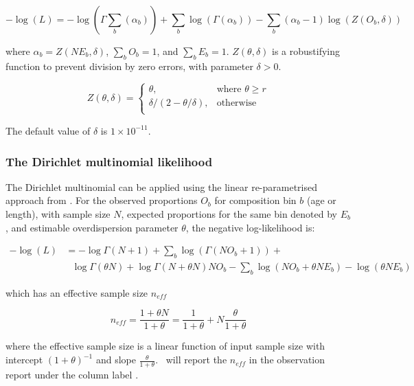 \begin{equation}
-\log \left(L \right) = -\log(\Gamma \sum\limits_b (\alpha_b)) + \sum\limits_b \log(\Gamma (\alpha_b)) - \sum\limits_b (\alpha_b-1) \log(Z(O_b,\delta))
\end{equation}

where $\alpha_b = Z \left(N E_b,\delta \right)$, $\sum\limits_b O_b = 1$, and $\sum\limits_b E_b = 1$. $Z \left(\theta,\delta \right)$ is a robustifying function to prevent division by zero errors, with parameter $\delta>0$.

\begin{equation}
Z \left(\theta,\delta \right) = \begin{cases}
\theta, & \text{where $\theta \ge r$} \\
\delta/\left( 2-\theta/\delta \right), & \text{otherwise} \\
\end{cases}
\end{equation}

The default value of $\delta$ is $1 \times 10^{-11}$.

\subsubsection*{The Dirichlet multinomial likelihood}

The Dirichlet multinomial can be applied using the linear re-parametrised approach from \citep{thorson2017model}. For the observed proportions $O_b$ for composition bin $b$ (age or length), with sample size $N$, expected proportions for the same bin denoted by $E_b$, and estimable overdispersion parameter \(\theta\), the negative log-likelihood is:

\begin{align*}
-\log \left(L \right) &=  -\log \Gamma \left(N + 1 \right) + \sum\limits_b \log \left( \Gamma \left(NO_b + 1\right) \right) + \\
 & \ \ \ \log \Gamma \left(\theta N\right) + \log \Gamma \left(N + \theta N\right)  NO_b - \sum\limits_b \log (NO_b + \theta N E_b) - \log(\theta N E_b)
\end{align*}

which has an effective sample size \(n_{eff}\)

\[
n_{eff} = \frac{1 + \theta N}{1 + \theta} = \frac{1}{1 + \theta} + N\frac{\theta}{1 + \theta}
\]

where the effective sample size is a linear function of input sample size with intercept \((1 + \theta)^{-1}\)  and slope \(\frac{\theta}{1 + \theta}\). \CNAME\ will report the \(n_{eff}\) in the observation report under the column label .

